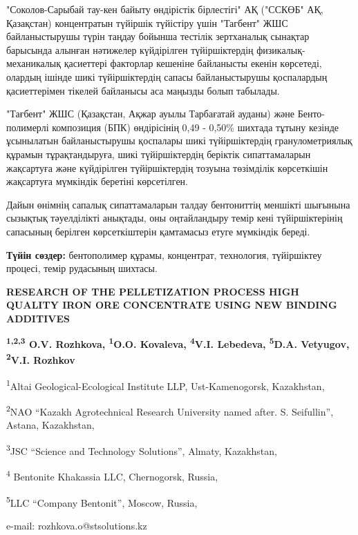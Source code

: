 "Соколов-Сарыбай тау-кен байыту өндірістік бірлестігі" АҚ ("ССКӨБ" АҚ,
Қазақстан) концентратын түйіршік түйістіру үшін "Тагбент" ЖШС
байланыстырушы түрін таңдау бойынша тестілік зертханалық сынақтар
барысында алынған нәтижелер күйдірілген түйіршіктердің
физикалық-механикалық қасиеттері факторлар кешеніне байланысты екенін
көрсетеді, олардың ішінде шикі түйіршіктердің сапасы байланыстырушы
қоспалардың қасиеттерімен тікелей байланысы аса маңызды болып табылады.

"Тағбент" ЖШС (Қазақстан, Ақжар ауылы Тарбағатай ауданы) және
Бенто-полимерлі композиция (БПК) өндірісінің 0,49 - 0,50\% шихтада
тұтыну кезінде ұсынылатын байланыстырушы қоспалары шикі түйіршіктердің
гранулометриялық құрамын тұрақтандыруға, шикі түйіршіктердің беріктік
сипаттамаларын жақсартуға және күйдірілген түйіршіктердің тозуына
төзімділік көрсеткішін жақсартуға мүмкіндік беретіні көрсетілген.

Дайын өнімнің сапалық сипаттамаларын талдау бентониттің меншікті
шығынына сызықтық тәуелділікті анықтады, оны оңтайландыру темір кені
түйіршіктерінің сапасының берілген көрсеткіштерін қамтамасыз етуге
мүмкіндік береді.

{\bfseries Түйін сөздер:} бентополимер құрамы, концентрат, технология,
түйіршіктеу процесі, темір рудасының шихтасы.

\begin{articleheader}
{\bfseries RESEARCH OF THE PELLETIZATION PROCESS HIGH QUALITY IRON ORE CONCENTRATE USING NEW BINDING ADDITIVES}

{\bfseries
\textsuperscript{1,2,3} O.V. Rozhkova\textsuperscript{\envelope },
\textsuperscript{1}O.O. Kovaleva,
\textsuperscript{4}V.I. Lebedeva,
\textsuperscript{5}D.A. Vetyugov,
\textsuperscript{2}V.I. Rozhkov
}
\end{articleheader}

\begin{affiliation}
\textsuperscript{1}Altai Geological-Ecological Institute LLP, Ust-Kamenogorsk, Kazakhstan,

\textsuperscript{2}NAO ``Kazakh Agrotechnical Research University named after. S. Seifullin'', Astana, Kazakhstan,

\textsuperscript{3}JSC ``Science and Technology Solutions'', Almaty, Kazakhstan,

\textsuperscript{4} Bentonite Khakassia LLC, Chernogorsk, Russia,

\textsuperscript{5}LLC ``Company Bentonit'', Moscow, Russia,

e-mail: rozhkova.o@stsolutions.kz
\end{affiliation}

